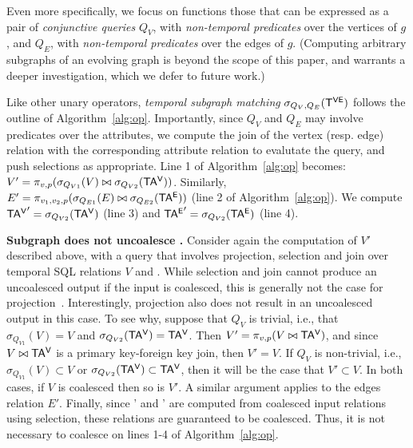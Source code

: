   Even more
specifically, we focus on functions those that can be expressed as a
pair of {\em conjunctive queries} $Q_V$, with {\em non-temporal
  predicates} over the vertices of $g$, and $Q_E$, with {\em
  non-temporal predicates} over the edges of $g$. (Computing arbitrary
subgraphs of an evolving graph is beyond the scope of this paper, and
warrants a deeper investigation, which we defer to future work.)

Like other unary operators, {\em temporal subgraph matching}
$\sigma_{Q_V, Q_E} (\mathsf{T^{VE}})$ follows the outline of
Algorithm~\ref{alg:op}.  Importantly, since $Q_V$ and $Q_E$ may
involve predicates over the attributes, we compute the join of the
vertex (resp. edge) relation with the corresponding attribute relation
to evalutate the query, and push selections as appropriate.  Line 1 of
Algorithm~\ref{alg:op} becomes: $V' = \pi_{v,p} (\sigma_{Q_{V1}} (V)
\bowtie \sigma_{Q_{V2}} (\mathsf{TA^{V}}))$.  Similarly, $E' = \pi_{v_1,v_2,p}
(\sigma_{Q_{E1}} (E) \bowtie \sigma_{Q_{E2}} (\mathsf{TA^{E}}))$ (line 2 of
Algorithm~\ref{alg:op}).  We compute $\mathsf{TA^{V}}' = \sigma_{Q_{V2}} (\mathsf{TA^{V}})$
(line 3) and $\mathsf{TA^{E}}' = \sigma_{Q_{V2}} (\mathsf{TA^{E}})$ (line 4).

{\bf Subgraph does not uncoalesce \tve.}%
Consider again the computation of $V'$ described above, with a query
that involves projection, selection and join over temporal SQL
relations $V$ and \tav.  While selection and join cannot produce an
uncoalesced output if the input is coalesced, this is generally not
the case for projection~\cite{DBLP:conf/vldb/BohlenSS96}.
Interestingly, projection also does not result in an uncoalesced
output in this case. To see why, suppose that $Q_V$ is trivial, i.e.,
that $\sigma_{Q_{V1}} (V) = V$ and $\sigma_{Q_{V2}} (\mathsf{TA^{V}}) =
\mathsf{TA^{V}}$. Then $V' = \pi_{v,p} (V \bowtie \mathsf{TA^{V}})$, and since $V \bowtie
\mathsf{TA^{V}}$ is a primary key-foreign key join, then $V' = V$.  If $Q_V$ is
non-trivial, i.e., $\sigma_{Q_{V1}} (V) \subset V$ or
$\sigma_{Q_{V2}} (\mathsf{TA^{V}}) \subset \mathsf{TA^{V}}$, then it will be the case that
$V' \subset V$.  In both cases, if $V$ is coalesced then so is $V'$.
A similar argument applies to the edges relation $E'$.  Finally, since
\tav' and \tae' are computed from coalesced input relations using
selection, these relations are guaranteed to be coalesced.  Thus, it
is not necessary to coalesce on lines 1-4 of Algorithm~\ref{alg:op}.

